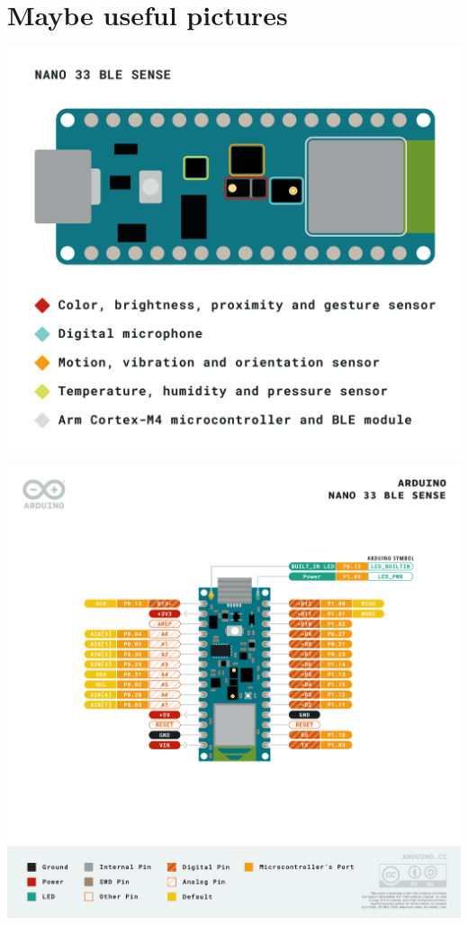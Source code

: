 \documentclass{article}
\begin{document}
\newpage
\section{Maybe useful pictures}

\includegraphics[width=\linewidth]{img/NANO-33-BLE-Sense_sensor-indentification.png}

\includegraphics[width=\linewidth]{img/Pinout-NANOsense_latest.png}
\end{document}
